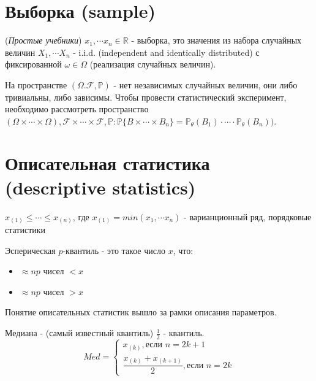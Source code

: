 \documentclass[a4 paper]{article}
\begin{document}
\section{Выборка (sample)}
\begin{defin}
(\textit{Простые учебники}) $x_1, \cdots x_n \in \mathbb{R}$ - выборка, это значения из набора случайных величин $X_1, \cdots X_n$ - i.i.d. (independent and identically distributed) с фиксированной $\omega \in \Omega$ (реализация случайных величин).
\end{defin}
\begin{remark}
На пространстве $(\Omega. \mathcal{F}, \mathbb{P})$ - нет независимых случайных величин, они либо тривиальны, либо зависимы. Чтобы провести статистический эксперимент, необходимо рассмотреть пространство $(\Omega \times \cdots \times \Omega), \mathcal{F} \times \cdots \times \mathcal{F}, \mathbb{P}: \mathbb{P}\{B \times \cdots\times B_n\} = \mathbb{P}_\theta(B_1) \cdot \cdots \cdot \mathbb{P}_\theta(B_n))$.
\end{remark}

\section{Описательная статистика (descriptive statistics)}
\begin{defin}
$x_{(1)} \leq \cdots \leq x_{(n)}$, где $x_{(1)} = min(x_1, \cdots x_n)$ - варианционный ряд, порядковые статистики
\end{defin}

\begin{defin}
Эсперическая $p$-квантиль - это такое число $x$, что:
\begin{itemize}
    \item $\approx np$ чисел $<x$
    \item $\approx np$ чисел $>x$
\end{itemize}
\end{defin}
\begin{remark}
Понятие описательных статистик вышло за рамки описания параметров. 
\end{remark}
\begin{defin}
Медиана - (самый известный квантиль) $\frac12$ - квантиль.
\begin{equation*}
Med = 
 \begin{cases}
   x_{(k)}, \text{если } n = 2k + 1 \\
   \dfrac{x_{(k)} + x_{(k + 1)}}{2}, \text{если } n =2k
 \end{cases}
\end{equation*}
\end{defin}
\end{document}
